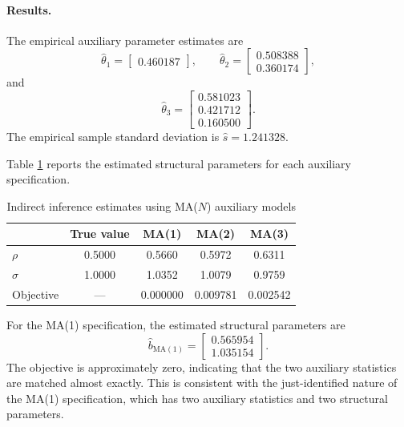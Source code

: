 \documentclass{article}
\begin{document}
\paragraph{Results.}

The empirical auxiliary parameter estimates are
\[
    \widehat\theta_1
    =
    \begin{bmatrix}
        0.460187
    \end{bmatrix},
    \qquad
    \widehat\theta_2
    =
    \begin{bmatrix}
        0.508388\\
        0.360174
    \end{bmatrix},
\]
and
\[
    \widehat\theta_3
    =
    \begin{bmatrix}
        0.581023\\
        0.421712\\
        0.160500
    \end{bmatrix}.
\]
The empirical sample standard deviation is
$\widehat s=1.241328$.

Table \ref{tab:indirect_inference} reports the estimated
structural parameters for each auxiliary specification.

\begin{table}[htbp]
    \centering
    \caption{Indirect inference estimates using MA($N$)
    auxiliary models}
    \label{tab:indirect_inference}
    \begin{tabular}{lcccc}
        \hline
        & True value & MA(1) & MA(2) & MA(3)\\
        \hline
        $\rho$
        & 0.5000 & 0.5660 & 0.5972 & 0.6311\\
        $\sigma$
        & 1.0000 & 1.0352 & 1.0079 & 0.9759\\
        Objective
        & --- & 0.000000 & 0.009781 & 0.002542\\
        \hline
    \end{tabular}
\end{table}

For the MA(1) specification, the estimated structural
parameters are
\[
    \widehat b_{\mathrm{MA}(1)}
    =
    \begin{bmatrix}
        0.565954\\
        1.035154
    \end{bmatrix}.
\]
The objective is approximately zero, indicating that
the two auxiliary statistics are matched almost exactly.
This is consistent with the just-identified nature of
the MA(1) specification, which has two auxiliary statistics
and two structural parameters.
\end{document}
